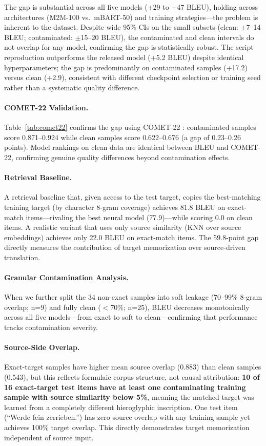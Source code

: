 \documentclass[11pt,a4paper]{article}
\begin{document}
The gap is substantial across all five models (+29 to +47 BLEU), holding across architectures (M2M-100 vs.\ mBART-50) and training strategies---the problem is inherent to the dataset. Despite wide 95\% CIs on the small subsets (clean: $\pm$7--14 BLEU; contaminated: $\pm$15--20 BLEU), the contaminated and clean intervals do not overlap for any model, confirming the gap is statistically robust. The script reproduction outperforms the released model (+5.2 BLEU) despite identical hyperparameters; the gap is predominantly on contaminated samples (+17.2) versus clean (+2.9), consistent with different checkpoint selection or training seed rather than a systematic quality difference.

\paragraph{COMET-22 Validation.} Table~\ref{tab:comet22} confirms the gap using COMET-22 \citep{rei2022comet}: contaminated samples score 0.871--0.924 while clean samples score 0.622--0.676 (a gap of 0.23--0.26 points). Model rankings on clean data are identical between BLEU and COMET-22, confirming genuine quality differences beyond contamination effects.



\paragraph{Retrieval Baseline.} A retrieval baseline that, given access to the test target, copies the best-matching training target (by character 8-gram coverage) achieves 81.8 BLEU on exact-match items---rivaling the best neural model (77.9)---while scoring 0.0 on clean items. A realistic variant that uses only source similarity (KNN over source embeddings) achieves only 22.0 BLEU on exact-match items. The 59.8-point gap directly measures the contribution of target memorization over source-driven translation.

\paragraph{Granular Contamination Analysis.} When we further split the 34 non-exact samples into soft leakage (70--99\% 8-gram overlap; n=9) and fully clean ($<$70\%; n=25), BLEU decreases monotonically across all five models---from exact to soft to clean---confirming that performance tracks contamination severity.

\paragraph{Source-Side Overlap.}
Exact-target samples have higher mean source overlap (0.883) than clean samples (0.543), but this reflects formulaic corpus structure, not causal attribution: \textbf{10 of 16 exact-target test items have at least one contaminating training sample with source similarity below 5\%}, meaning the matched target was learned from a completely different hieroglyphic inscription. One test item (``Werde fein zerrieben.'') has zero source overlap with any training sample yet achieves 100\% target overlap. This directly demonstrates target memorization independent of source input.
\end{document}
